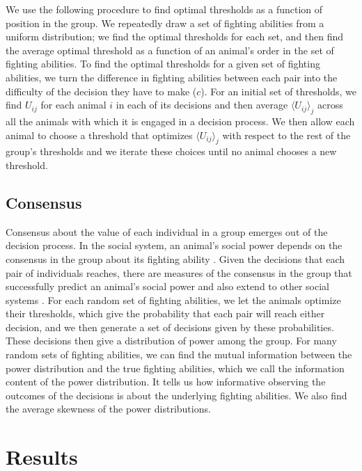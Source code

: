 \documentclass{article}
\begin{document}
 We use the following procedure to find optimal thresholds as a function of position in the group.  We repeatedly draw a set of fighting abilities from a uniform distribution; we find the optimal thresholds for each set, and then find the average optimal threshold as a function of an animal's order in the set of fighting abilities. To find the optimal thresholds for a given set of fighting abilities, we turn the difference in fighting abilities between each pair into the difficulty of the decision they have to make ($c$).  For an initial set of thresholds, we find $U_{ij}$ for each animal $i$ in each of its decisions and then average $\langle U_{ij}\rangle_j$ across all the animals with which it is engaged in a decision process.  We then allow each animal to choose a threshold that optimizes $\langle U_{ij}\rangle_j$ with respect to the rest of the group's thresholds and we iterate these choices until no animal chooses a new threshold.  

\subsection{Consensus }
Consensus about the value of each individual in a group emerges out of the decision process.  In the social system, an animal's social power depends on the consensus in the group about its fighting ability \cite{Flack:2004oq,Flack:2006uq,Brush:2013fk}.  Given the decisions that each pair of individuals reaches, there are measures of the consensus in the group that successfully predict an animal's social power and also extend to other social systems \cite{Brush:2013fk}.  For each random set of fighting abilities, we let the animals optimize their thresholds, which give the probability that each pair will reach either decision, and we then generate a set of decisions given by these probabilities.  These decisions then give a distribution of power among the group.  For many random sets of fighting abilities, we can find the mutual information between the power distribution and the true fighting abilities, which we call the information content of the power distribution. It tells us how informative observing the outcomes of the decisions is about the underlying fighting abilities.  We also find the average skewness of the power distributions.

\section{Results}
\end{document}
